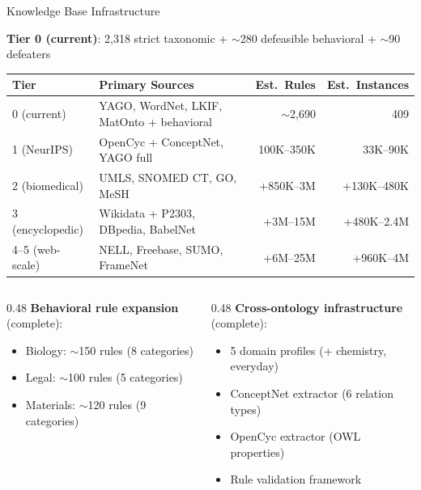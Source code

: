 \documentclass[aspectratio=169]{beamer}
\begin{document}
\begin{frame}{Knowledge Base Infrastructure}

\small
\textbf{Tier 0 (current)}: 2,318 strict taxonomic + ${\sim}$280 defeasible behavioral + ${\sim}$90 defeaters

\vspace{0.2em}
\footnotesize
\begin{tabular}{@{}llrr@{}}
\toprule
\textbf{Tier} & \textbf{Primary Sources} & \textbf{Est.\ Rules} & \textbf{Est.\ Instances} \\
\midrule
0 (current) & YAGO, WordNet, LKIF, MatOnto + behavioral & ${\sim}$2,690 & 409 \\
1 (NeurIPS) & OpenCyc + ConceptNet, YAGO full & 100K--350K & 33K--90K \\
2 (biomedical) & UMLS, SNOMED CT, GO, MeSH & +850K--3M & +130K--480K \\
3 (encyclopedic) & Wikidata + P2303, DBpedia, BabelNet & +3M--15M & +480K--2.4M \\
4--5 (web-scale) & NELL, Freebase, SUMO, FrameNet & +6M--25M & +960K--4M \\
\bottomrule
\end{tabular}

\small
\vspace{0.3em}
\begin{columns}[T]
\begin{column}{0.48\textwidth}
\textbf{Behavioral rule expansion} (complete):
\begin{itemize}\setlength\itemsep{0pt}
    \item Biology: ${\sim}$150 rules (8 categories)
    \item Legal: ${\sim}$100 rules (5 categories)
    \item Materials: ${\sim}$120 rules (9 categories)
\end{itemize}
\end{column}
\begin{column}{0.48\textwidth}
\textbf{Cross-ontology infrastructure} (complete):
\begin{itemize}\setlength\itemsep{0pt}
    \item 5 domain profiles (+ chemistry, everyday)
    \item ConceptNet extractor (6 relation types)
    \item OpenCyc extractor (OWL properties)
    \item Rule validation framework
\end{itemize}
\end{column}
\end{columns}
\end{frame}
\end{document}
